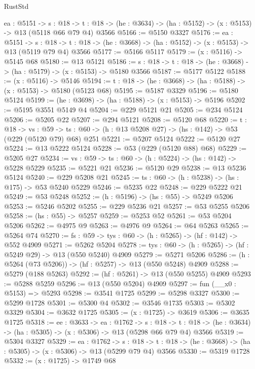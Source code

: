 \begin{lexlean}{RustStd}
\begin{coremodule}
  {ea : @5151} ->
  {s : @18} ->
  {t : @18} -> (he : @3634) -> (ha : @5152) -> (x : @5153) -> @13 (@5118 @66 @79 @4) @3566
@5166 := @5150 @3327
@5176 := {ea : @5151} ->
  {s : @18} -> {t : @18} -> (he : @3668) -> (ha : @5152) -> (x : @5153) -> @13 (@5119 @79 @4) @3566
@5177 := @5166 @5117
@5179 := (x : @5116) -> @5145 @68
@5180 := @13 @5121
@5186 := {s : @18} -> {t : @18} -> (he : @3668) -> (ha : @5179) -> (x : @5153) -> @5180 @3566
@5187 := @5177 @5122
@5188 := (x : @5116) -> @5146
@5194 := {t : @18} -> (he : @3668) -> (ha : @5188) -> (x : @5153) -> @5180 (@5123 @68)
@5195 := @5187 @3329
@5196 := @5180 @5124
@5199 := (he : @3698) -> (ha : @5188) -> (x : @5153) -> @5196
@5202 := @5195 @3551 @5149 @4
@5204 := @229 @5121 @21
@5205 := @234 @5124
@5206 := @5205 @22
@5207 := @294 @5121
@5208 := @5120 @68
@5220 := {t : @18} ->
  {vs : @59} -> {ts : @60} -> (h : @13 @5208 @27) -> (hs : @142) -> @53 (@229 (@5120 @79) @68) @251
@5221 := @5207 @5124
@5222 := @5120 @27
@5224 := @13 @5222 @5124
@5228 := @53 (@229 (@5120 @88) @68)
@5229 := @5205 @27
@5234 := {vs : @59} -> {ts : @60} -> (h : @5224) -> (hs : @142) -> @5228 @5229
@5235 := @5221 @21
@5236 := @5120 @29
@5238 := @13 @5236 @5124
@5240 := @229 @5208 @21
@5245 := {ts : @60} -> (h : @5238) -> (hs : @175) -> @53 @5240 @5229
@5246 := @5235 @22
@5248 := @229 @5222 @21
@5249 := @53 @5248
@5252 := (h : @5196) -> (hs : @55) -> @5249 @5206
@5253 := @5246 @5202
@5255 := @229 @5236 @21
@5257 := @53 @5255 @5206
@5258 := (hs : @55) -> @5257
@5259 := @5253 @52
@5261 := @53 @5204 @5206
@5262 := @4975 @9
@5263 := @4976 @9
@5264 := @64 @5263
@5265 := @5264 @74
@5270 := {fs : @59} -> {tys : @60} -> (h : @5265) -> (hf : @142) -> @552 @4909
@5271 := @5262 @5204
@5278 := {tys : @60} -> (h : @5265) -> (hf : @5249 @29) -> @13 (@550 @5240) @4909
@5279 := @5271 @5206
@5286 := (h : @5264 (@73 @5206)) -> (hf : @5257) -> @13 (@550 @5248) @4909
@5288 := @5279 (@188 @5263)
@5292 := (hf : @5261) -> @13 (@550 @5255) @4909
@5293 := @5288 @5259
@5296 := @13 (@550 @5204) @4909
@5297 := fun (__x0 : @5153) => @5293
@5298 := @3541 @1725
@5299 := @5298 @3327
@5300 := @5299 @1728
@5301 := @5300 @4
@5302 := @3546 @1735
@5303 := @5302 @3329
@5304 := @3632 @1725
@5305 := (x : @1725) -> @3619
@5306 := @3635 @1725
@5318 := {ee : @3633} ->
  {ea : @1762} ->
  {s : @18} ->
  {t : @18} -> (he : @3634) -> (ha : @5305) -> (x : @5306) -> @13 (@5298 @66 @79 @4) @3566
@5319 := @5304 @3327
@5329 := {ea : @1762} ->
  {s : @18} -> {t : @18} -> (he : @3668) -> (ha : @5305) -> (x : @5306) -> @13 (@5299 @79 @4) @3566
@5330 := @5319 @1728
@5332 := (x : @1725) -> @1749 @68

\end{coremodule}
\end{lexlean}
